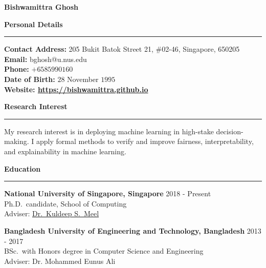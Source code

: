 \documentclass[a4paper,10pt,final]{article}
\newcommand{\Sep}{\vspace{1.5em}}
\newcommand{\SmallSep}{\vspace{0.5em}}
\newcommand{\blue}[1]{\textcolor{blue}{#1}}
\begin{document}
	
	\begin{center}
		\Huge \textbf{Bishwamittra Ghosh}\\
		\vspace{0.2em}	
	\end{center}
	
	\Sep
	\Large { \textbf{Personal Details}}\\
	\noindent\rule{\textwidth}{1pt}
	\normalsize 
	 \textbf{Contact Address:} 205 Bukit Batok Street 21, \#02-46, Singapore, 650205\\
	\textbf{Email:} bghosh@u.nus.edu  \\
	\textbf{Phone:} $ +65 85990160 $\\
	\textbf{Date of Birth:}  $ 28 $  November  $ 1995 $ \\
	\textbf{Website: \blue{\url{https://bishwamittra.github.io}}} 

	\Sep	
\Large { \textbf{Research Interest}}\\
\noindent\rule{\textwidth}{1pt}
\normalsize
My research interest is in deploying machine learning in high-stake decision-making. I apply formal methods to verify and improve fairness, interpretability, and explainability in machine learning. 
	
	\Sep	
\Large { \textbf{Education}}\\
\noindent\rule{\textwidth}{1pt}
\normalsize
\textbf{National University of Singapore, Singapore}
\hspace*{\fill} 2018  - Present\\
Ph.D.\ candidate, School of Computing\\
Adviser: \href{https://www.comp.nus.edu.sg/~meel/}{Dr.\ Kuldeep S.\ Meel}

\SmallSep
\textbf{Bangladesh University of Engineering and Technology, Bangladesh}
\hspace*{\fill} 2013  -  2017\\
BSc.\ with Honors degree in Computer Science and Engineering\\
Adviser: Dr. Mohammed Eunus Ali
\end{document}

